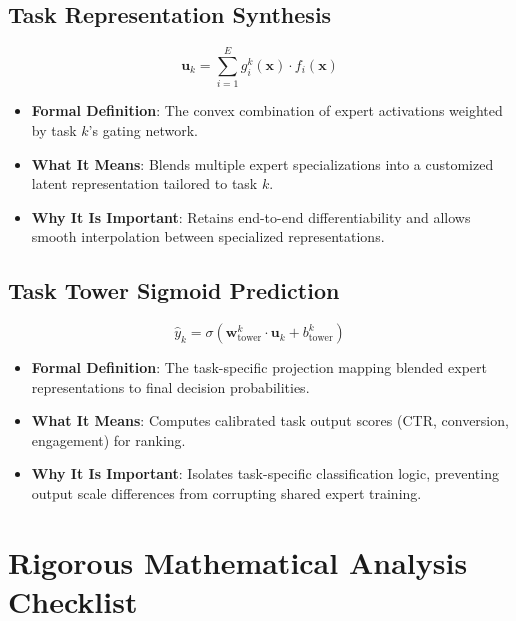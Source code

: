 \documentclass[11pt,a4paper]{article}
\theoremstyle{definition}
\begin{document}
\subsection{Task Representation Synthesis}
{\boldmath
\begin{equation}
\mathbf{u}_k = \sum_{i=1}^E g_i^k(\mathbf{x}) \cdot f_i(\mathbf{x})
\end{equation}
}
\begin{itemize}
    \item \textbf{Formal Definition}: The convex combination of expert activations weighted by task $k$'s gating network.
    \item \textbf{What It Means}: Blends multiple expert specializations into a customized latent representation tailored to task $k$.
    \item \textbf{Why It Is Important}: Retains end-to-end differentiability and allows smooth interpolation between specialized representations.
\end{itemize}

\subsection{Task Tower Sigmoid Prediction}
{\boldmath
\begin{equation}
\widehat{y}_k = \sigma\left( \mathbf{w}_{\text{tower}}^k \cdot \mathbf{u}_k + b_{\text{tower}}^k \right)
\end{equation}
}
\begin{itemize}
    \item \textbf{Formal Definition}: The task-specific projection mapping blended expert representations to final decision probabilities.
    \item \textbf{What It Means}: Computes calibrated task output scores (CTR, conversion, engagement) for ranking.
    \item \textbf{Why It Is Important}: Isolates task-specific classification logic, preventing output scale differences from corrupting shared expert training.
\end{itemize}

\section{Rigorous Mathematical Analysis Checklist}
\end{document}
